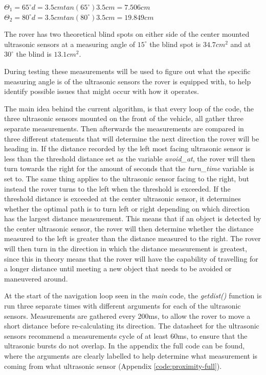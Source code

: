 $\Theta_1 = 65^\circ$\quad\quad$d = 3.5cm$\quad\quad$tan(65^\circ)3.5cm =  7.506cm$\\
$\Theta_2 = 80^\circ$\quad\quad$d = 3.5cm$\quad\quad$tan(80^\circ)3.5cm =  19.849cm$

The rover has two theoretical blind spots on either side of the center mounted ultrasonic sensors at a measuring angle of $15^\circ$ the blind spot is $34.7cm^2$ and at $30^\circ$ the blind is $13.1cm^2$. 

During testing these measurements will be used to figure out what the specific measuring angle is of the ultrasonic sensors the rover is equipped with, to help identify possible issues that might occur with how it operates.

\clearpage


The main idea behind the current algorithm, is that every loop of the code, the three ultrasonic sensors mounted on the front of the vehicle, all gather three separate measurements. Then afterwards the measurements are compared in three different statements that will determine the next direction the rover will be heading in. If the distance recorded by the left most facing ultrasonic sensor is less than the threshold distance set as the variable \textit{avoid\_at}, the rover will then turn towards the right for the amount of seconds that the \textit{turn\_time} variable is set to. The same thing applies to the ultrasonic sensor facing to the right, but instead the rover turns to the left when the threshold is exceeded.
If the threshold distance is exceeded at the center ultrasonic sensor, it determines whether the optimal path is to turn left or right depending on which direction has the largest distance measurement. This means that if an object is detected by the center ultrasonic sensor, the rover will then determine whether the distance measured to the left is greater than the distance measured to the right. The rover will then turn in the direction in which the distance measurement is greatest, since this in theory means that the rover will have the capability of travelling for a longer distance until meeting a new object that needs to be avoided or maneuvered around.




At the start of the navigation loop seen in the \textit{main} code, the \textit{getdist()} function is run three separate times with different arguments for each of the ultrasonic sensors. Measurements are gathered every 200ms, to allow the rover to move a short distance before re-calculating its direction. The datasheet for the ultrasonic sensors recommend a measurements cycle of at least 60ms, to ensure that the ultrasonic bursts do not overlap. In the appendix the full code can be found, where the arguments are clearly labelled to help determine what measurement is coming from what ultrasonic sensor (Appendix \ref{code:proximity-full}).